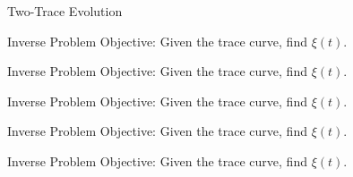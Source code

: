 \documentclass{beamer}
\begin{document}
\begin{frame}{Two-Trace Evolution}
\end{frame}

\begin{frame}{Inverse Problem}
    Objective: Given the trace curve, find $\xi(t)$.
\begin{adjustbox}{max totalsize={\textwidth}{\textheight}}

\end{adjustbox}
\end{frame}

\begin{frame}{Inverse Problem}
    Objective: Given the trace curve, find $\xi(t)$.
\begin{adjustbox}{max totalsize={\textwidth}{\textheight}}

\end{adjustbox}
\end{frame}

\begin{frame}{Inverse Problem}
    Objective: Given the trace curve, find $\xi(t)$.
\begin{adjustbox}{max totalsize={\textwidth}{\textheight}}

\end{adjustbox}
\end{frame}

\begin{frame}{Inverse Problem}
    Objective: Given the trace curve, find $\xi(t)$.
\begin{adjustbox}{max totalsize={\textwidth}{\textheight}}

\end{adjustbox}
\end{frame}

\begin{frame}{Inverse Problem}
    Objective: Given the trace curve, find $\xi(t)$.
\begin{adjustbox}{max totalsize={\textwidth}{\textheight}}

\end{adjustbox}
\end{frame}
\end{document}
